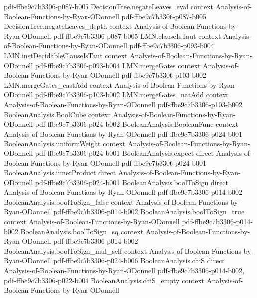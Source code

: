 \begin{lemma}
  {pdf-ffbe9c7b3306-p087-b005}
\proofstep
  {DecisionTree.negateLeaves_eval}
  {context}
  {Analysis-of-Boolean-Functions-by-Ryan-ODonnell}
  {pdf-ffbe9c7b3306-p087-b005}
\proofstep
  {DecisionTree.negateLeaves_depth}
  {context}
  {Analysis-of-Boolean-Functions-by-Ryan-ODonnell}
  {pdf-ffbe9c7b3306-p087-b005}
\proofstep
  {LMN.clauseIsTaut}
  {context}
  {Analysis-of-Boolean-Functions-by-Ryan-ODonnell}
  {pdf-ffbe9c7b3306-p093-b004}
\proofstep
  {LMN.instDecidableClauseIsTaut}
  {context}
  {Analysis-of-Boolean-Functions-by-Ryan-ODonnell}
  {pdf-ffbe9c7b3306-p093-b004}
\proofstep
  {LMN.mergeGates}
  {context}
  {Analysis-of-Boolean-Functions-by-Ryan-ODonnell}
  {pdf-ffbe9c7b3306-p103-b002}
\proofstep
  {LMN.mergeGates_castAdd}
  {context}
  {Analysis-of-Boolean-Functions-by-Ryan-ODonnell}
  {pdf-ffbe9c7b3306-p103-b002}
\proofstep
  {LMN.mergeGates_natAdd}
  {context}
  {Analysis-of-Boolean-Functions-by-Ryan-ODonnell}
  {pdf-ffbe9c7b3306-p103-b002}
\proofstep
  {BooleanAnalysis.BoolCube}
  {context}
  {Analysis-of-Boolean-Functions-by-Ryan-ODonnell}
  {pdf-ffbe9c7b3306-p024-b002}
\proofstep
  {BooleanAnalysis.BooleanFunc}
  {context}
  {Analysis-of-Boolean-Functions-by-Ryan-ODonnell}
  {pdf-ffbe9c7b3306-p024-b001}
\proofstep
  {BooleanAnalysis.uniformWeight}
  {context}
  {Analysis-of-Boolean-Functions-by-Ryan-ODonnell}
  {pdf-ffbe9c7b3306-p024-b001}
\proofstep
  {BooleanAnalysis.expect}
  {direct}
  {Analysis-of-Boolean-Functions-by-Ryan-ODonnell}
  {pdf-ffbe9c7b3306-p024-b001}
\proofstep
  {BooleanAnalysis.innerProduct}
  {direct}
  {Analysis-of-Boolean-Functions-by-Ryan-ODonnell}
  {pdf-ffbe9c7b3306-p024-b001}
\proofstep
  {BooleanAnalysis.boolToSign}
  {direct}
  {Analysis-of-Boolean-Functions-by-Ryan-ODonnell}
  {pdf-ffbe9c7b3306-p014-b002}
\proofstep
  {BooleanAnalysis.boolToSign_false}
  {context}
  {Analysis-of-Boolean-Functions-by-Ryan-ODonnell}
  {pdf-ffbe9c7b3306-p014-b002}
\proofstep
  {BooleanAnalysis.boolToSign_true}
  {context}
  {Analysis-of-Boolean-Functions-by-Ryan-ODonnell}
  {pdf-ffbe9c7b3306-p014-b002}
\proofstep
  {BooleanAnalysis.boolToSign_sq}
  {context}
  {Analysis-of-Boolean-Functions-by-Ryan-ODonnell}
  {pdf-ffbe9c7b3306-p014-b002}
\proofstep
  {BooleanAnalysis.boolToSign_mul_self}
  {context}
  {Analysis-of-Boolean-Functions-by-Ryan-ODonnell}
  {pdf-ffbe9c7b3306-p024-b006}
\proofstep
  {BooleanAnalysis.chiS}
  {direct}
  {Analysis-of-Boolean-Functions-by-Ryan-ODonnell}
  {pdf-ffbe9c7b3306-p014-b002,
    pdf-ffbe9c7b3306-p022-b004}
\proofstep
  {BooleanAnalysis.chiS_empty}
  {context}
  {Analysis-of-Boolean-Functions-by-Ryan-ODonnell}

\end{lemma}
